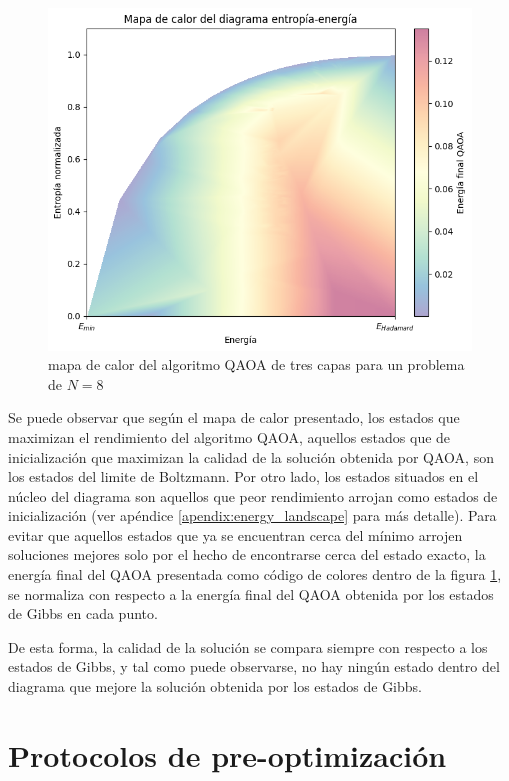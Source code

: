 \begin{figure}[!h]
    \centering
    \includegraphics[scale = 0.8]{plt/06-mapa_calor.png}
    \caption{mapa de calor del algoritmo QAOA de tres capas para un problema de $N=8$}
    \label{fig:mapa_calor}
\end{figure}

Se puede observar que según el mapa de calor presentado, los estados que maximizan el rendimiento del algoritmo QAOA, aquellos estados que de inicialización que maximizan la calidad de la solución obtenida por QAOA, son los estados del limite de Boltzmann. Por otro lado, los estados situados en el núcleo del diagrama son aquellos que peor rendimiento arrojan como estados de inicialización (ver apéndice \ref{apendix:energy_landscape}  para más detalle). Para evitar que aquellos estados que ya se encuentran cerca del mínimo arrojen soluciones mejores solo por el hecho de encontrarse cerca del estado exacto, la energía final del QAOA presentada como código de colores dentro de la figura \ref{fig:mapa_calor}, se normaliza con respecto a la energía final del QAOA obtenida por los estados de Gibbs en cada punto.

\newpage

De esta forma, la calidad de la solución se compara siempre con respecto a los estados de Gibbs, y tal como puede observarse, no hay ningún estado dentro del diagrama que mejore la solución obtenida por los estados de Gibbs.

\section{Protocolos de pre-optimización}

